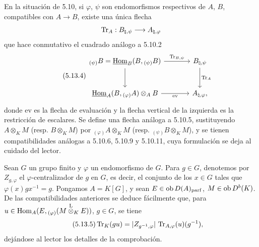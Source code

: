 En la situación de 5.10, si $\varphi$, $\psi$ son endomorfismos respectivos de $A$, $B$, compatibles con $A\to B$, existe una única flecha
\[
\operatorname{Tr}_A:B_{\natural,\psi}\longrightarrow A_{\natural,\varphi}
\]
que hace conmutativo el cuadrado análogo a 5.10.2
\begin{equation}\tag{5.13.4}
\begin{tikzcd}[column sep=large,row sep=large]
{}_{(\psi)}B=\uHom_B(B,{}_{(\psi)}B) \arrow[r,"\Tr_{B,\psi}"] \arrow[d] & B_{\natural,\psi} \arrow[d,"\Tr_A"]\\
\uHom_A(B,{}_{(\varphi)}A)\otimes_AB \arrow[r,"\mathrm{ev}"'] & A_{\natural,\varphi},
\end{tikzcd}
\end{equation}
donde $\mathrm{ev}$ es la flecha de evaluación y la flecha vertical de la izquierda es la restricción de escalares. Se define una flecha análoga a 5.10.5, sustituyendo $A\otimes_KM$ (resp. $B\otimes_KM$) por ${}_{(\varphi)}A\otimes_KM$ (resp. ${}_{(\psi)}B\otimes_KM$), y se tienen compatibilidades análogas a 5.10.6, 5.10.9 y 5.10.11, cuya formulación se deja al cuidado del lector.

Sean $G$ un grupo finito y $\varphi$ un endomorfismo de $G$. Para $g\in G$, denotemos por $Z_{g,\varphi}$ el $\varphi$-centralizador de $g$ en $G$, es decir, el conjunto de los $x\in G$ tales que $\varphi(x)gx^{-1}=g$. Pongamos $A=K[G]$, y sean $E\in\operatorname{ob} D(A)_{\mathrm{parf}}$, $M\in\operatorname{ob} D^b(K)$. De las compatibilidades anteriores se deduce fácilmente que, para $u\in\operatorname{Hom}_A(E,{}_{(\varphi)}(M\overset{\mathrm L}{\otimes}_KE))$, $g\in G$, se tiene
\begin{equation}\tag{5.13.5}
\operatorname{Tr}_K(gu)=|Z_{g^{-1},\varphi}|\,\operatorname{Tr}_{A,\varphi}(u)(g^{-1}),
\end{equation}
dejándose al lector los detalles de la comprobación.
